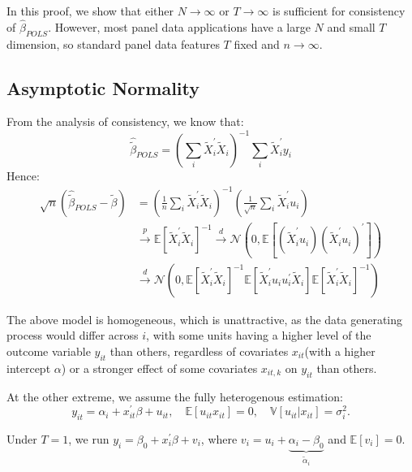In this proof, we show that either $N \to \infty $ or $T \to  \infty $ is sufficient for consistency of $\hat{\beta}_{POLS}$.
However, most panel data applications have a large $N$ and small $T$ dimension, so standard panel data
features $T$ fixed and $n \to \infty $.

\subsection{Asymptotic Normality}

From the analysis of consistency, we know that:
\[ 
\hat{\tilde{\beta}}_{POLS}  = \left(\sum_i \tilde{X}_i^{\prime} \tilde{X}_i \right)^{-1} \sum_i \tilde{X}_i^{\prime} y_i
\]
Hence:
\begin{align*}
    \sqrt{n} (\hat{\tilde{\beta}}_{POLS}  - \tilde{\beta}) &= \left(\frac{1}{n} \sum_i \tilde{X}_i^{\prime} \tilde{X}_i \right)^{-1} \left(\frac{1}{\sqrt{n} } \sum_i \tilde{X}_i^{\prime} u_i \right) \\
    & \overset{p}{\rightarrow}\mathbb{E}[\tilde{X}_i^{\prime} \tilde{X}_i]^{-1} \overset{d}{\rightarrow} \mathcal{N}\left(0, \mathbb{E}\left[\left(\tilde{X}_i^{\prime} u_i\right) \left(\tilde{X}_i^{\prime} u_i\right)^{\prime} \right] \right)\\
    & \overset{d}{\rightarrow} \mathcal{N} \left(0, \mathbb{E}\left[\tilde{X}_i^{\prime} \tilde{X}_i \right]^{-1} \mathbb{E}\left[\tilde{X}_i^{\prime} u_i u_i^{\prime} \tilde{X}_i \right] \mathbb{E}\left[\tilde{X}_i^{\prime} \tilde{X}_i \right]^{-1} \right)
\end{align*}


The above model is homogeneous, which is unattractive, as the data generating process would 
differ across $i$, with some units having a higher level of the outcome variable $y_{it} $
than others, regardless of covariates $x_{it}$(with a higher intercept $\alpha$) or a stronger effect
of some covariates $x_{it, k} $ on $y_{it}$ than others.

At the other extreme, we assume the fully heterogenous estimation:
\[y_{it} = \alpha_i + x_{it}^{\prime} \beta + u_{it}, \quad \mathbb{E}[u_{it} x_{it}] = 0, \quad \mathbb{V}[u_{it} | x_{it}] = \sigma_i^2. \]

Under $T=1$, we run $y_i = \beta_0 + x_i^{\prime} \beta + v_i$, 
where $v_i = u_i + \underset{\tilde{\alpha}_i}{\underbrace{\alpha_i - \beta_0}}$
and $\mathbb{E}[v_i] = 0$.

